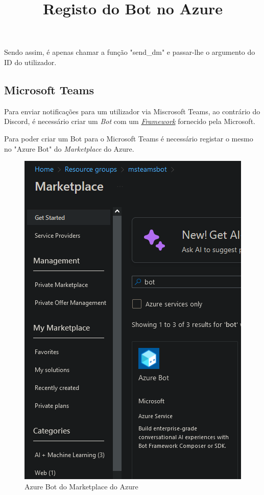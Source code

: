 Sendo assim, é apenas chamar a função "send\_dm" e passar-lhe o argumento do ID do utilizador. \\




\subsection{Microsoft Teams}

Para enviar notificações para um utilizador via Miscrosoft Teams, ao contrário do Discord,
é necessário criar um \textit{Bot} com um \href{https://learn.microsoft.com/en-us/azure/bot-service/bot-service-overview?view=azure-bot-service-4.0}{\textit{Framework}}
fornecido pela Microsoft. \\



\title*{\textbf{Registo do Bot no Azure}}

Para poder criar um Bot para o Microsoft Teams é necessário registar o mesmo 
no "Azure Bot" do \textit{Marketplace} do Azure.

\begin{figure}[H]
\begin{center}
\includegraphics[width=14cm]{figs/marketplace azure bot.png}
\caption{Azure Bot do Marketplace do Azure}
\label{fig:bookstack}
\end{center}
\end{figure}

